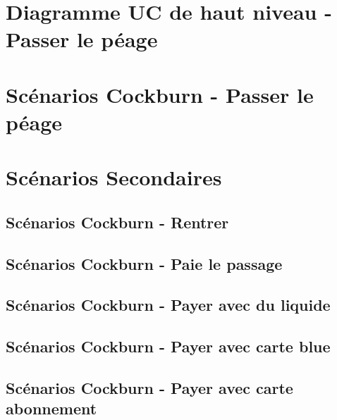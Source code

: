 \label{Cap:TD2}

\section{Diagramme UC de haut niveau - Passer le péage}
    

\newpage
\section{Scénarios Cockburn - Passer le péage}\label{sec:passer}
    

\newpage
\section{Scénarios Secondaires}

\subsection{Scénarios Cockburn - Rentrer} \label{subsec:rentre}
    

\newpage
\subsection{Scénarios Cockburn - Paie le passage} \label{subsec:paie}
    
 
 \newpage   
\subsection{Scénarios Cockburn - Payer avec du liquide} \label{subsec:paieLiquide}
    
\newpage
\subsection{Scénarios Cockburn - Payer avec carte blue} \label{subsec:paierBleu}
    
\newpage
\subsection{Scénarios Cockburn - Payer avec carte abonnement} \label{subsec:paierAbonement}
    

%    

